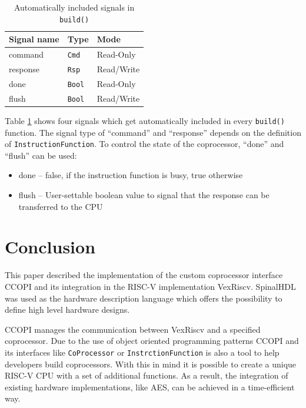 \documentclass[twoside,twocolumn]{article}
\newcommand{\code}[1]{\texttt{#1}}
\begin{document}
\begin{table}[h]
\centering
\begin{tabular}{lll}
    Signal name & Type & Mode \\
    \hline
    command & \code{Cmd} & Read-Only \\
    response & \code{Rsp} & Read/Write\\
    done & \code{Bool} & Read-Only\\
    flush & \code{Bool} & Read/Write
\end{tabular}
    \caption{Automatically included signals in \code{build()}}
    \label{tab:signals}
\end{table}
\noindent Table \ref*{tab:signals} shows four signals which get automatically
included in every \code{build()} function. The signal type of
``command''
and ``response'' depends on the definition of
\code{InstructionFunction}. To control the state of the coprocessor,
``done'' and ``flush'' can be used:
\begin{itemize}
    \item done -- false, if the instruction function is busy, true
        otherwise
    \item flush -- User-settable boolean value to signal that the response
        can be transferred to the CPU
\end{itemize}

\section{Conclusion}
This paper described the implementation of the custom coprocessor
interface CCOPI and its integration in the RISC-V implementation
VexRiscv. SpinalHDL was used as the hardware description language
which offers the possibility to define high level hardware designs.

CCOPI manages the communication between VexRiscv and a specified
coprocessor. Due to the use of object oriented programming patterns
CCOPI and its interfaces like \code{CoProcessor} or
\code{InstrctionFunction} is also a tool to help developers build
coprocessors. With this in mind it is possible to create a unique
RISC-V CPU with a set of additional functions. As a result, the integration of
existing hardware implementations, like AES, can be achieved in a 
time-efficient way. 
\vfill



\end{document}
